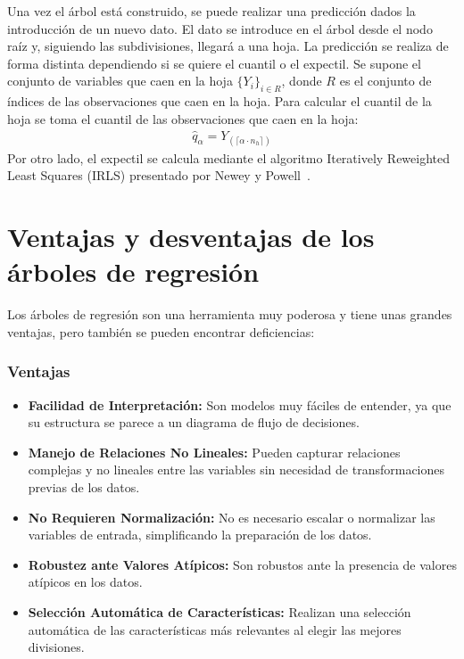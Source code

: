 \documentclass[11pt]{book}
\theoremstyle{plain} %
\theoremstyle{definition} %
\begin{document}
Una vez el árbol está construido, se puede realizar una predicción dados la introducción de 
un nuevo dato. El dato se introduce en el árbol desde el nodo raíz y, siguiendo las 
subdivisiones, llegará a una hoja. La predicción se realiza de forma distinta 
dependiendo si se quiere el cuantil o el expectil. Se supone el conjunto de 
variables que caen en la hoja $\{Y_i\}_{i \in R}$, donde $R$ es el conjunto de
índices de las observaciones que caen en la hoja. Para calcular el cuantil de la hoja 
se toma el cuantil de las observaciones que caen en la hoja:
\begin{align*}
   \hat{q}_\alpha = Y_{(\lceil \alpha \cdot n_h \rceil)}
\end{align*}
Por otro lado, el expectil se calcula mediante el 
algoritmo Iteratively Reweighted Least Squares (IRLS) presentado 
por Newey y Powell~\cite{NP87}.

\section{Ventajas y desventajas de los árboles de regresión}
Los árboles de regresión son una herramienta muy poderosa y tiene unas 
grandes ventajas, pero también se pueden encontrar deficiencias:

\subsubsection*{Ventajas}
\begin{itemize}
    \item \textbf{Facilidad de Interpretación:} Son modelos muy  fáciles de 
    entender, ya que su estructura se parece a un diagrama de flujo de 
    decisiones.
    \item \textbf{Manejo de Relaciones No Lineales:} Pueden capturar 
    relaciones complejas y no lineales entre las variables sin necesidad de 
    transformaciones previas de los datos.
    \item \textbf{No Requieren Normalización:} No es necesario escalar o 
    normalizar las variables de entrada, simplificando la preparación de los datos.
    \item \textbf{Robustez ante Valores Atípicos:} Son robustos ante la presencia 
    de valores atípicos en los datos.
    \item \textbf{Selección Automática de Características:} Realizan una 
    selección automática de las características más relevantes al elegir las 
    mejores divisiones.
\end{itemize}
\end{document}
